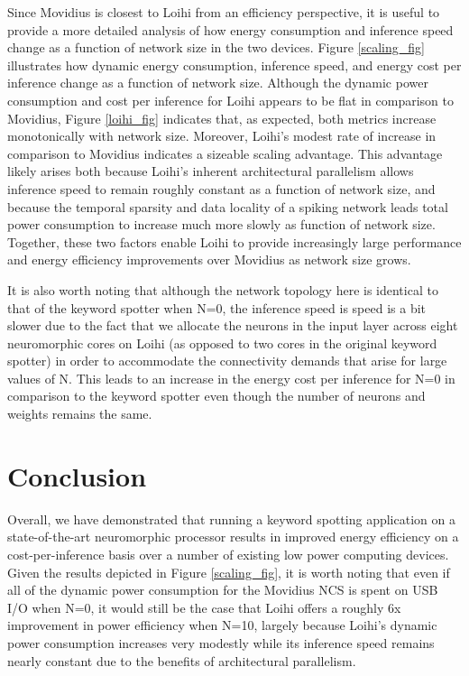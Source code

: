 \documentclass{article}
\begin{document}
Since Movidius is closest to Loihi from an efficiency perspective, it is useful to provide a more detailed analysis of how energy consumption and inference speed change as a function of network size in the two devices. Figure \ref{scaling_fig} illustrates how dynamic energy consumption, inference speed, and energy cost per inference change as a function of network size. Although the dynamic power consumption and cost per inference for Loihi appears to be flat in comparison to Movidius, Figure \ref{loihi_fig} indicates that, as expected, both metrics increase monotonically with network size. Moreover, Loihi's modest rate of increase in comparison to Movidius indicates a sizeable scaling advantage. This advantage likely arises both because Loihi's inherent architectural parallelism allows inference speed to remain roughly constant as a function of network size, and because the temporal sparsity and data locality of a spiking network leads total power consumption to increase much more slowly as function of network size. Together, these two factors enable Loihi to provide increasingly large performance and energy efficiency improvements over Movidius as network size grows. 

It is also worth noting that although the network topology here is identical to that of the keyword spotter when N=0, the inference speed is speed is a bit slower due to the fact that we allocate the neurons in the input layer across eight neuromorphic cores on Loihi (as opposed to two cores in the original keyword spotter) in order to accommodate the connectivity demands that arise for large values of N. This leads to an increase in the energy cost per inference for N=0 in comparison to the keyword spotter even though the number of neurons and weights remains the same. 

\section{Conclusion}

Overall, we have demonstrated that running a keyword spotting application on a state-of-the-art neuromorphic processor results in improved energy efficiency on a cost-per-inference basis over a number of existing low power computing devices. Given the results depicted in Figure \ref{scaling_fig}, it is worth noting that even if all of the dynamic power consumption for the Movidius NCS is spent on USB I/O when N=0, it would still be the case that Loihi offers a roughly 6x improvement in power efficiency when N=10, largely because Loihi's dynamic power consumption increases very modestly while its inference speed remains nearly constant due to the benefits of architectural parallelism. 
\end{document}
